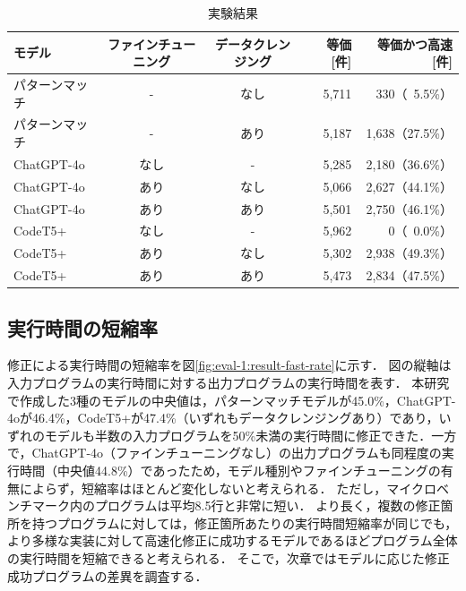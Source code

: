 \documentclass[11pt]{jreport}
\newcommand{\fix}[1]{#1}
\newcommand{\fixthree}[1]{#1}
\begin{document}
\begin{table}[t]
\caption{実験結果}
\label{table:eval-1:result-test-fast}
\centering
\begin{tabular}{lcc|rr}
\hline
モデル & ファインチューニング & データクレンジング & 等価 [件] & 等価かつ高速 [件] \\
\hline
パターンマッチ & - & なし & 5,711 & 330\fix{（\textcolor{white}{0}5.5\%）} \\ %
パターンマッチ & - & あり & 5,187 & 1,638\fix{（27.5\%）} \\ %
ChatGPT-4o & なし & - & 5,285 & 2,180\fix{（36.6\%）} \\ %
ChatGPT-4o & あり & なし & 5,066 & 2,627\fix{（44.1\%）} \\ %
ChatGPT-4o & あり & あり & 5,501 & 2,750\fix{（46.1\%）} \\ %
CodeT5+ & なし & - & \fix{5,962} & 0\fix{（\textcolor{white}{0}0.0\%）} \\ %
CodeT5+ & あり & なし & 5,302 & 2,938\fix{（49.3\%）} \\ %
CodeT5+ & あり & あり & 5,473 & 2,834\fix{（47.5\%）} \\ %
\hline
\end{tabular}
\end{table}




\subsection{\fix{実行時間の短縮率}}


\fix{修正による実行時間の短縮率を図\ref{fig:eval-1:result-fast-rate}に示す．}
\fix{図の縦軸は入力プログラムの実行時間に対する出力プログラムの実行時間を表す．}
\fixthree{本研究で作成した3種のモデルの中央値は，パターンマッチモデルが45.0\%，ChatGPT-4oが46.4\%，CodeT5+が47.4\%（いずれもデータクレンジングあり）であり，いずれのモデルも半数の入力プログラムを50\%未満の実行時間に修正できた．一方で，ChatGPT-4o（ファインチューニングなし）の出力プログラムも同程度の実行時間（中央値44.8\%）であったため，モデル種別やファインチューニングの有無によらず，短縮率はほとんど変化しないと考えられる．}
\fix{ただし，マイクロベンチマーク内のプログラムは平均8.5行と非常に短い．}
\fix{より長く，複数の修正箇所を持つプログラムに対しては，修正箇所あたりの実行時間短縮率が同じでも，より多様な実装に対して高速化修正に成功するモデルであるほどプログラム全体の実行時間を短縮できると考えられる．}
\fix{そこで，次章ではモデルに応じた修正成功プログラムの差異を調査する．}
\end{document}
